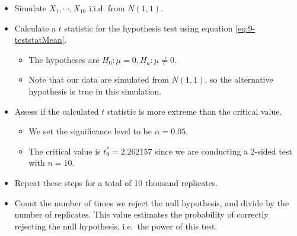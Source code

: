 \documentclass[
]{book}
\providecommand{\tightlist}{%
  \setlength{\itemsep}{0pt}\setlength{\parskip}{0pt}}
\begin{document}
\begin{itemize}
\tightlist
\item
  Simulate \(X_1, \cdots, X_{10}\) i.i.d. from \(N(1,1)\).
\item
  Calculate a \(t\) statistic for the hypothesis test using equation \eqref{eq:9-teststatMean}.

  \begin{itemize}
  \tightlist
  \item
    The hypotheses are \(H_0: \mu = 0, H_a: \mu \neq 0\).
  \item
    Note that our data are simulated from \(N(1,1)\), so the alternative hypothesis is true in this simulation.
  \end{itemize}
\item
  Assess if the calculated \(t\) statistic is more extreme than the critical value.

  \begin{itemize}
  \tightlist
  \item
    We set the significance level to be \(\alpha = 0.05\).
  \item
    The critical value is \(t_9^* = 2.262157\) since we are conducting a 2-sided test with \(n=10\).
  \end{itemize}
\item
  Repeat these steps for a total of 10 thousand replicates.
\item
  Count the number of times we reject the null hypothesis, and divide by the number of replicates. This value estimates the probability of correctly rejecting the null hypothesis, i.e.~the power of this test.
\end{itemize}
\end{document}
